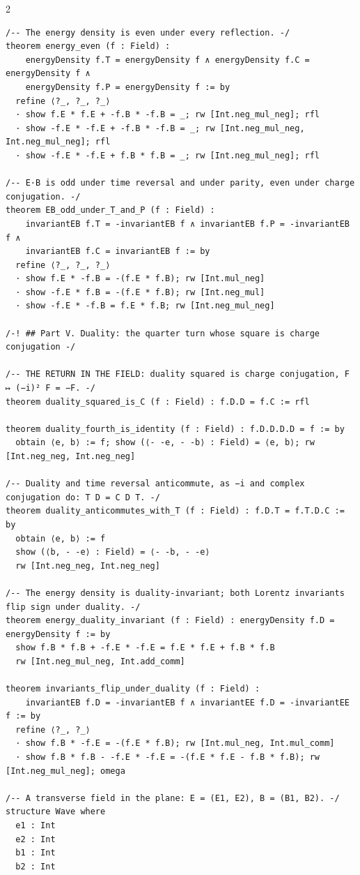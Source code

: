 \documentclass[10pt]{article}
\begin{document}
\begin{multicols}{2}
\begin{Verbatim}[fontsize=\fontsize{6.0}{6.9}\selectfont,breaklines,breakanywhere,breaksymbolleft={}]
/-- The energy density is even under every reflection. -/
theorem energy_even (f : Field) :
    energyDensity f.T = energyDensity f ∧ energyDensity f.C = energyDensity f ∧
    energyDensity f.P = energyDensity f := by
  refine ⟨?_, ?_, ?_⟩
  · show f.E * f.E + -f.B * -f.B = _; rw [Int.neg_mul_neg]; rfl
  · show -f.E * -f.E + -f.B * -f.B = _; rw [Int.neg_mul_neg, Int.neg_mul_neg]; rfl
  · show -f.E * -f.E + f.B * f.B = _; rw [Int.neg_mul_neg]; rfl

/-- E·B is odd under time reversal and under parity, even under charge conjugation. -/
theorem EB_odd_under_T_and_P (f : Field) :
    invariantEB f.T = -invariantEB f ∧ invariantEB f.P = -invariantEB f ∧
    invariantEB f.C = invariantEB f := by
  refine ⟨?_, ?_, ?_⟩
  · show f.E * -f.B = -(f.E * f.B); rw [Int.mul_neg]
  · show -f.E * f.B = -(f.E * f.B); rw [Int.neg_mul]
  · show -f.E * -f.B = f.E * f.B; rw [Int.neg_mul_neg]

/-! ## Part V. Duality: the quarter turn whose square is charge conjugation -/

/-- THE RETURN IN THE FIELD: duality squared is charge conjugation, F ↦ (−i)² F = −F. -/
theorem duality_squared_is_C (f : Field) : f.D.D = f.C := rfl

theorem duality_fourth_is_identity (f : Field) : f.D.D.D.D = f := by
  obtain ⟨e, b⟩ := f; show (⟨- -e, - -b⟩ : Field) = ⟨e, b⟩; rw [Int.neg_neg, Int.neg_neg]

/-- Duality and time reversal anticommute, as −i and complex conjugation do: T D = C D T. -/
theorem duality_anticommutes_with_T (f : Field) : f.D.T = f.T.D.C := by
  obtain ⟨e, b⟩ := f
  show (⟨b, - -e⟩ : Field) = ⟨- -b, - -e⟩
  rw [Int.neg_neg, Int.neg_neg]

/-- The energy density is duality-invariant; both Lorentz invariants flip sign under duality. -/
theorem energy_duality_invariant (f : Field) : energyDensity f.D = energyDensity f := by
  show f.B * f.B + -f.E * -f.E = f.E * f.E + f.B * f.B
  rw [Int.neg_mul_neg, Int.add_comm]

theorem invariants_flip_under_duality (f : Field) :
    invariantEB f.D = -invariantEB f ∧ invariantEE f.D = -invariantEE f := by
  refine ⟨?_, ?_⟩
  · show f.B * -f.E = -(f.E * f.B); rw [Int.mul_neg, Int.mul_comm]
  · show f.B * f.B - -f.E * -f.E = -(f.E * f.E - f.B * f.B); rw [Int.neg_mul_neg]; omega

/-- A transverse field in the plane: E = (E1, E2), B = (B1, B2). -/
structure Wave where
  e1 : Int
  e2 : Int
  b1 : Int
  b2 : Int


\end{Verbatim}
\end{multicols}
\end{document}
